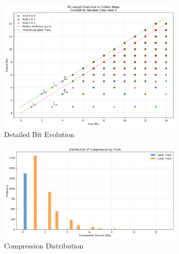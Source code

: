 \begin{figure}[ht]
\centering
\includegraphics[width=0.8\textwidth]{entropy/bit_evolution_detailed.png}
\caption{Detailed Bit Evolution}
\label{fig:bit_evolution_detailed}
\end{figure}

\begin{figure}[ht]
\centering
\includegraphics[width=0.8\textwidth]{entropy/compression_distribution.png}
\caption{Compression Distribution}
\label{fig:compression_distribution}
\end{figure} 